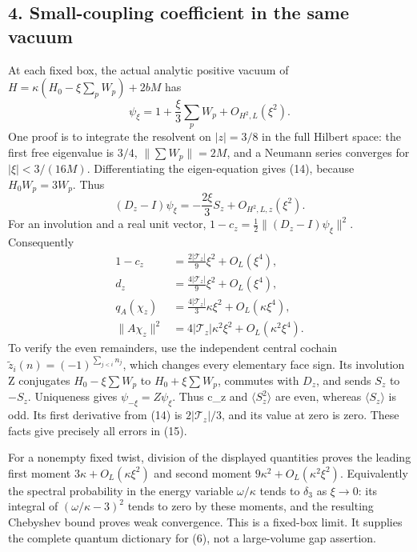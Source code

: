 \documentclass[
  11pt,
]{article}
\begin{document}
\subsection{4. Small-coupling coefficient in the same
vacuum}\label{magnetic-part-7-small-coupling-coefficient-in-the-same-vacuum}

At each fixed box, the actual analytic positive vacuum of
\(H=\kappa(H_0-\xi\sum_pW_p)+2bM\) has \[
 \psi_\xi=1+\frac\xi3\sum_pW_p+O_{H^2,L}(\xi^2).
\tag{14}
\] One proof is to integrate the resolvent on \(|z|=3/8\) in the full
Hilbert space: the first free eigenvalue is \(3/4\),
\(\|\sum W_p\|=2M\), and a Neumann series converges for
\(|\xi|<3/(16M)\). Differentiating the eigen-equation gives (14),
because \(H_0W_p=3W_p\). Thus \[
 (D_z-I)\psi_\xi=-\frac{2\xi}{3}S_z+O_{H^2,L,z}(\xi^2).
\] For an involution and a real unit vector,
\(1-c_z=\tfrac12\|(D_z-I)\psi_\xi\|^2\). Consequently \[
 \begin{split}
 1-c_z&=\frac{2|\mathcal T_z|}{9}\xi^2+O_L(\xi^4),\\
 d_z&=\frac{4|\mathcal T_z|}{9}\xi^2+O_L(\xi^4),\\
 q_A(\chi_z)&=\frac{4|\mathcal T_z|}{3}\kappa\xi^2
                         +O_L(\kappa\xi^4),\\
 \|A\chi_z\|^2&=4|\mathcal T_z|\kappa^2\xi^2
                         +O_L(\kappa^2\xi^4).
 \end{split}
\tag{15}
\] To verify the even remainders, use the independent central cochain
\(\widetilde z_i(n)=(-1)^{\sum_{j<i}n_j}\), which changes every
elementary face sign. Its involution Z conjugates \(H_0-\xi\sum W_p\) to
\(H_0+\xi\sum W_p\), commutes with \(D_z\), and sends \(S_z\) to
\(-S_z\). Uniqueness gives \(\psi_{-\xi}=Z\psi_\xi\). Thus c\_z and
\(\langle S_z^2\rangle\) are even, whereas \(\langle S_z\rangle\) is
odd. Its first derivative from (14) is \(2|\mathcal T_z|/3\), and its
value at zero is zero. These facts give precisely all errors in (15).

For a nonempty fixed twist, division of the displayed quantities proves
the leading first moment \(3\kappa+O_L(\kappa\xi^2)\) and second moment
\(9\kappa^2+O_L(\kappa^2\xi^2)\). Equivalently the spectral probability
in the energy variable \(\omega/\kappa\) tends to \(\delta_3\) as
\(\xi\to0\): its integral of \((\omega/\kappa-3)^2\) tends to zero by
these moments, and the resulting Chebyshev bound proves weak
convergence. This is a fixed-box limit. It supplies the complete quantum
dictionary for (6), not a large-volume gap assertion.
\end{document}
